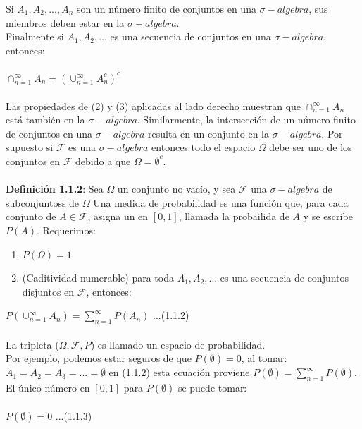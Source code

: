 \documentclass{article}
\begin{document}
        Si $A_1, A_2, ..., A_n $ son un número finito de conjuntos en una $\sigma-algebra$, sus miembros deben estar en la $\sigma-algebra$.
        \\
        Finalmente si $A_1, A_2, ...$ es una secuencia de conjuntos en una $\sigma-algebra$, entonces:
        \\
        \\
        $\cap_{n=1}^\infty A_n = (\cup_{n=1}^\infty A_n^c)^c$
        \\
        \\
        Las propiedades de (2) y (3) aplicadas al lado derecho muestran que $\cap_{n=1}^\infty A_n$  está también en la $\sigma-algebra$.
        Similarmente, la intersección de un número finito de conjuntos en una $\sigma-algebra$ resulta en un conjunto en la $\sigma-algebra$. Por supuesto si $\mathcal{F}$
        es una $\sigma-algebra$ entonces todo el espacio $\Omega$ debe ser uno de los conjuntos en $\mathcal{F}$ debido a que $\Omega=\emptyset^c$.
        \\
        \\
        \textbf{Definición 1.1.2}: Sea $\Omega$ un conjunto no vacío, y sea $\mathcal{F}$ una $\sigma-algebra$ de subconjuntoss de $\Omega$ Una medida de probabilidad es una
        función que, para cada conjunto de $A \in \mathcal{F}$, asigna un en $[0,1]$, llamada la probailida de $A$ y se escribe $P(A)$. Requerimos:
        \begin{enumerate}
            \item $P(\Omega) = 1$
            \item (Caditividad numerable) para toda $A_1, A_2, ...$ es una secuencia de conjuntos disjuntos en $\mathcal{F}$, entonces:
        \end{enumerate}
        $P(\cup_{n=1}^\infty A_n) = \sum_{n=1}^{\infty} P(A_n)$ ...(1.1.2)
        \\
        \\
        La tripleta ($\Omega, \mathcal{F}, P$) es llamado un espacio de probabilidad.
        \\
        Por ejemplo, podemos estar seguros de que $P(\emptyset) = 0$, al tomar:
        \\
        $A_1 = A_2 = A_3 = ... = \emptyset$ en (1.1.2) esta ecuación proviene $P(\emptyset) = \sum_{n=1}^{\infty}P(\emptyset)$. El único número en $[0,1]$
        para $P(\emptyset)$ se puede tomar:
        \\
        \\
        $P(\emptyset) = 0$ ...(1.1.3)
\end{document}
